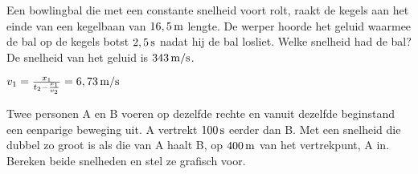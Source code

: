 \documentclass{ximera}
\begin{document}
\begin{exercise}
    Een bowlingbal die met een constante snelheid voort rolt, raakt de kegels aan het einde van een kegelbaan van $16,5\rm\,m$ lengte. De werper hoorde het geluid waarmee de bal op de kegels botst $2,5\rm\,s$ nadat hij de bal losliet. Welke snelheid had de bal? De snelheid van het geluid is $343\rm\,m/s$. 
    \begin{oplossing}
    $v_1=\frac{x_1}{t_2-\frac{x_1}{v_2}}=6,73\rm\,m/s$
    \end{oplossing}
\end{exercise}

\begin{exercise}
    Twee personen A en B voeren op dezelfde rechte en vanuit dezelfde beginstand een eenparige beweging uit. A vertrekt $100\rm\,s$ eerder dan B. Met een snelheid die dubbel zo groot is als die van A haalt B, op $400\rm\,m$ van het vertrekpunt, A in. Bereken beide snelheden en stel ze grafisch voor.
\end{exercise}
\end{document}
